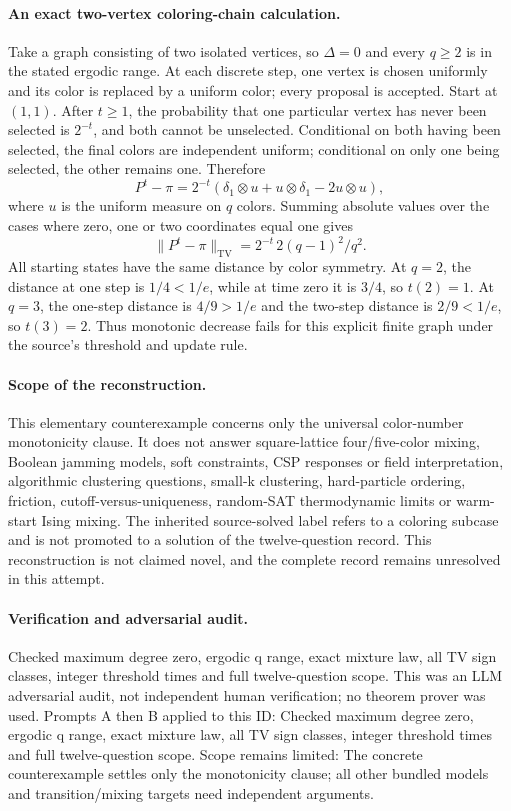 \documentclass[11pt]{article}
\begin{document}
\paragraph{An exact two-vertex coloring-chain calculation.}Take a graph consisting of two isolated vertices, so \(\Delta=0\) and every \(q\ge2\) is in the stated ergodic range. At each discrete step, one vertex is chosen uniformly and its color is replaced by a uniform color; every proposal is accepted. Start at \((1,1)\). After \(t\ge1\), the probability that one particular vertex has never been selected is \(2^{-t}\), and both cannot be unselected. Conditional on both having been selected, the final colors are independent uniform; conditional on only one being selected, the other remains one. Therefore
\[P^t-\pi=2^{-t}(\delta_1\otimes u+u\otimes\delta_1-2u\otimes u),
\]
where \(u\) is the uniform measure on \(q\) colors. Summing absolute values over the cases where zero, one or two coordinates equal one gives
\[\|P^t-\pi\|_{\mathrm{TV}}=2^{-t}\,2(q-1)^2/q^2.
\]
All starting states have the same distance by color symmetry. At \(q=2\), the distance at one step is \(1/4<1/e\), while at time zero it is \(3/4\), so \(t(2)=1\). At \(q=3\), the one-step distance is \(4/9>1/e\) and the two-step distance is \(2/9<1/e\), so \(t(3)=2\). Thus monotonic decrease fails for this explicit finite graph under the source's threshold and update rule.
\paragraph{Scope of the reconstruction.}This elementary counterexample concerns only the universal color-number monotonicity clause. It does not answer square-lattice four/five-color mixing, Boolean jamming models, soft constraints, CSP responses or field interpretation, algorithmic clustering questions, small-k clustering, hard-particle ordering, friction, cutoff-versus-uniqueness, random-SAT thermodynamic limits or warm-start Ising mixing. The inherited source-solved label refers to a coloring subcase and is not promoted to a solution of the twelve-question record. This reconstruction is not claimed novel, and the complete record remains unresolved in this attempt.

\paragraph{Verification and adversarial audit.}
Checked maximum degree zero, ergodic q range, exact mixture law, all TV sign classes, integer threshold times and full twelve-question scope. This was an LLM adversarial audit, not independent human verification; no theorem prover was used. Prompts A then B applied to this ID: Checked maximum degree zero, ergodic q range, exact mixture law, all TV sign classes, integer threshold times and full twelve-question scope. Scope remains limited: The concrete counterexample settles only the monotonicity clause; all other bundled models and transition/mixing targets need independent arguments.
\end{document}
